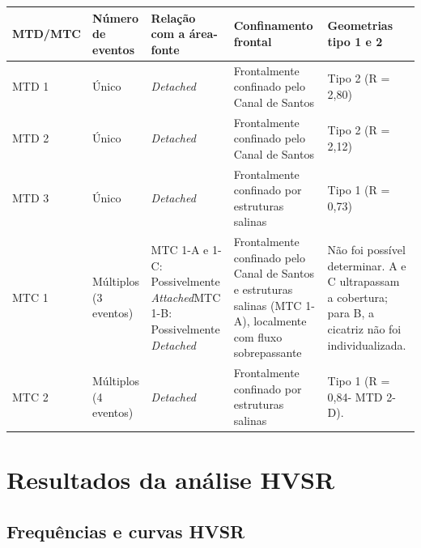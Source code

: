 \begin{quadro}
  \centering
  \caption[Síntese da classificação dos depósitos e complexos de transporte de massa quanto ao número de eventos, à relação com a área-fonte]{Síntese da classificação dos depósitos e complexos de transporte de massa quanto ao número de eventos, à relação com a área-fonte, ao confinamento frontal e à geometria. R corresponde à razão entre o comprimento da escarpa de cabeceira e a distância até a frente do depósito.}
  \label{qua:resultado-2}
  \small
  \setlength{\tabcolsep}{2.5pt}
  \begin{tabularx}{\textwidth}{|>{\raggedright\arraybackslash}X|>{\centering\arraybackslash}X|>{\centering\arraybackslash}X|>{\centering\arraybackslash}X|>{\centering\arraybackslash}X|}
    \hline
    \textbf{MTD/MTC} & \textbf{Número de eventos \cite{clare2018}} & \textbf{Relação com a área-fonte \cite{moscardelli2008}} & \textbf{Confinamento frontal \cite{frey2006}} & \textbf{Geometrias tipo 1 e 2 \cite{gamboa2016}} \\
    \hline
    MTD 1 & Único & \textit{Detached} & Frontalmente confinado pelo Canal de Santos & Tipo 2 (R = 2,80) \\
    \hline
    MTD 2 & Único & \textit{Detached} & Frontalmente confinado pelo Canal de Santos & Tipo 2 (R = 2,12) \\
    \hline
    MTD 3 & Único & \textit{Detached} & Frontalmente confinado por estruturas salinas & Tipo 1 (R = 0,73) \\
    \hline
    MTC 1 & Múltiplos (3 eventos) & MTC 1-A e 1-C: Possivelmente \textit{Attached}\newline MTC 1-B: Possivelmente \textit{Detached} & Frontalmente confinado pelo Canal de Santos e estruturas salinas (MTC 1-A), localmente com fluxo sobrepassante & Não foi possível determinar. A e C ultrapassam a cobertura; para B, a cicatriz não foi individualizada. \\
    \hline
    MTC 2 & Múltiplos (4 eventos) & \textit{Detached} & Frontalmente confinado por estruturas salinas & Tipo 1 (R = 0,84- MTD 2-D). \\
    \hline
  \end{tabularx}
\end{quadro}

\section{Resultados da análise HVSR}\label{sec:5-10}

\subsection{Frequências e curvas HVSR}\label{sec:5-10-1}

